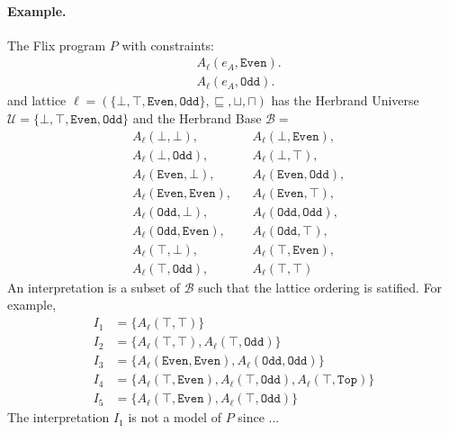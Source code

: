 \documentclass[10pt,twocolumn]{article}
\begin{document}
\paragraph{Example.}
The Flix program $P$ with constraints:
\begin{align*}
    & A_\ell(e_A, \texttt{Even}). \\
    & A_\ell(e_A, \texttt{Odd}).
\end{align*}
and lattice $\ell = (\{\bot, \top, \texttt{Even}, \texttt{Odd}\}, \sqsubseteq, \sqcup, \sqcap)$ has
the Herbrand Universe $\mathcal{U} = \{\bot, \top, \texttt{Even}, \texttt{Odd}\}$ and 
the Herbrand Base $\mathcal{B} = $
%
\begin{align*}
    & A_\ell(\bot, \bot), && A_\ell(\bot, \texttt{Even}), \\
    & A_\ell(\bot, \texttt{Odd}), && A_\ell(\bot, \top), \\
    & A_\ell(\texttt{Even}, \bot), && A_\ell(\texttt{Even}, \texttt{Odd}), \\
    & A_\ell(\texttt{Even}, \texttt{Even}), && A_\ell(\texttt{Even}, \top), \\
    & A_\ell(\texttt{Odd}, \bot), && A_\ell(\texttt{Odd}, \texttt{Odd}), \\
    & A_\ell(\texttt{Odd}, \texttt{Even}), && A_\ell(\texttt{Odd}, \top), \\
    & A_\ell(\top, \bot), && A_\ell(\top, \texttt{Even}), \\
    & A_\ell(\top, \texttt{Odd}), && A_\ell(\top, \top)
\end{align*}
%
An interpretation is a subset of $\mathcal{B}$ such that the lattice ordering is satified. 
For example,
%
\begin{align*}
    I_1 & = \{ A_\ell(\top, \top) \} \\
    I_2 & = \{ A_\ell(\top, \top), A_\ell(\top, \texttt{Odd}) \} \\
    I_3 & = \{ A_\ell(\texttt{Even}, \texttt{Even}), A_\ell(\texttt{Odd}, \texttt{Odd}) \} \\
    I_4 & = \{ A_\ell(\top, \texttt{Even}), A_\ell(\top, \texttt{Odd}),  A_\ell(\top, \texttt{Top}) \} \\
    I_5 & = \{ A_\ell(\top, \texttt{Even}), A_\ell(\top, \texttt{Odd}) \}
\end{align*}
%
The interpretation $I_1$ is not a model of $P$ since ...
\end{document}
